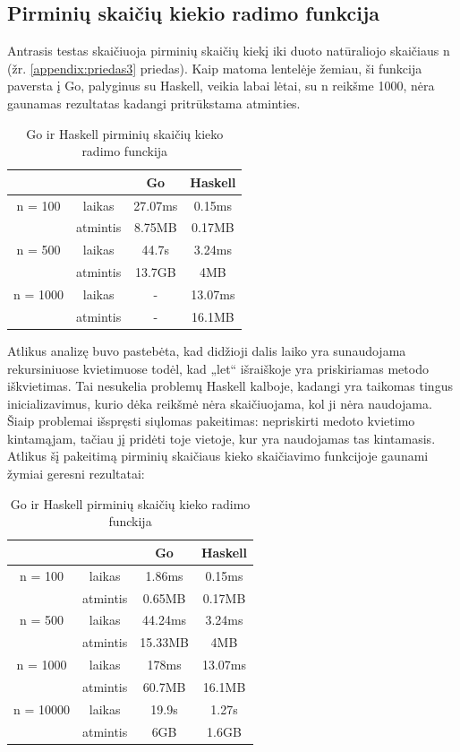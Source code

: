 \documentclass{VUMIFPSbakalaurinis}
\begin{document}
	\subsection{Pirminių skaičių kiekio radimo funkcija}
	 Antrasis testas skaičiuoja pirminių skaičių kiekį iki duoto natūraliojo skaičiaus n (žr. \ref{appendix:priedas3} priedas). Kaip matoma lentelėje žemiau, ši funkcija paversta į Go, palyginus su Haskell, veikia labai lėtai, su n reikšme 1000, nėra gaunamas rezultatas kadangi pritrūkstama atminties.
	\begin{center}
		\centering
		\begin{table}[H]
			\caption{Go ir Haskell pirminių skaičių kieko radimo funckija}
			\centering
		\begin{tabular}{ cccc } 
		& & \textbf{Go} & \textbf{Haskell}  \\
		\midrule
		n = 100 & laikas & 27.07ms & 0.15ms    \\
		& atmintis & 8.75MB & 0.17MB \\
		\midrule
		n = 500 & laikas & 44.7s & 3.24ms  \\
		& atmintis & 13.7GB & 4MB \\
		\midrule
		n = 1000 & laikas & - & 13.07ms  \\
		& atmintis & - & 16.1MB \\
		\end{tabular}
		\centering
	\end{table}
		\end{center}
		Atlikus analizę buvo pastebėta, kad didžioji dalis laiko yra sunaudojama rekursiniuose kvietimuose todėl, kad „let“ išraiškoje yra priskiriamas metodo iškvietimas. Tai nesukelia problemų Haskell kalboje, kadangi  yra taikomas tingus inicializavimus, kurio dėka reikšmė nėra skaičiuojama, kol ji nėra naudojama. Šiaip problemai išspręsti siųlomas pakeitimas: nepriskirti medoto kvietimo kintamąjam, tačiau jį pridėti toje vietoje, kur yra naudojamas tas kintamasis. Atlikus šį pakeitimą pirminių skaičiaus kieko skaičiavimo funkcijoje gaunami žymiai geresni rezultatai:
		\begin{center}
			\centering
			\begin{table}[H]
				\caption{Go ir Haskell pirminių skaičių kieko radimo funckija}
				\centering
			\begin{tabular}{ cccc } 
			& & \textbf{Go} & \textbf{Haskell}  \\
			\midrule
			n = 100 & laikas & 1.86ms & 0.15ms    \\
			& atmintis & 0.65MB & 0.17MB \\
			\midrule
			n = 500 & laikas & 44.24ms & 3.24ms  \\
			& atmintis & 15.33MB & 4MB \\
			\midrule
			n = 1000 & laikas & 178ms & 13.07ms  \\
			& atmintis & 60.7MB & 16.1MB \\
			\midrule
			n = 10000 & laikas & 19.9s & 1.27s  \\
			& atmintis & 6GB & 1.6GB \\
			\end{tabular}
			\centering
		\end{table}
			\end{center}
\end{document}
